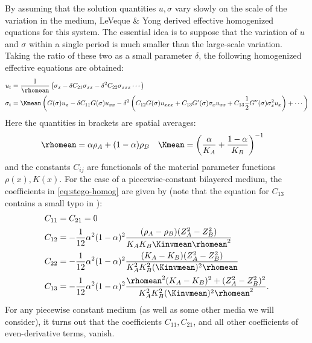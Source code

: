 By assuming that the solution quantities $u, \sigma$ vary slowly
on the scale of the variation in the medium, LeVeque \& Yong derived
effective homogenized equations for this system.    The essential idea is to suppose
that the variation of $u$ and $\sigma$ within a single period is
much smaller than the large-scale variation.  Taking the ratio
of these two as a small parameter $\delta$, the following
homogenized effective equations are obtained:
\begin{align}
u_t & = \frac{1}{\rhomean}\left(\sigma_x-\delta C_{21}\sigma_{xx} 
              - \delta^2 C_{22}\sigma_{xxx} \cdots \right) \\
\sigma_t & = \Kmean\left(G(\sigma)u_x - \delta C_{11}G(\sigma)u_{xx} 
              - \delta^2 \left(C_{12}G(\sigma)u_{xxx} 
                    + C_{13} G'(\sigma)\sigma_x u_{xx} 
                    + C_{13} \frac{1}{2} G''(\sigma)\sigma_x^2 u_x\right)
                    + \cdots \right)
\end{align}
Here the quantities in brackets are spatial averages:
\begin{align}
\rhomean & = \alpha \rho_A + (1-\alpha) \rho_B &
\Kmean   & = \left( \frac{\alpha}{K_A}+\frac{1-\alpha}{K_B} \right)^{-1}
\end{align}
and the constants $C_{ij}$ are functionals of the material parameter
functions $\rho(x), K(x)$.  
For the case of a piecewise-constant bilayered medium,
the coefficients in \eqref{eq:stego-homog} are given by
(note that the equation for $C_{13}$ contains a small typo in
\cite{leveque2003}):
\begin{subequations} \label{eq:stego-coeffs}
\begin{align}
C_{11} & = C_{21}=0 \\
C_{12} & = -\frac{1}{12}\alpha^2(1-\alpha)^2 
            \frac{(\rho_A-\rho_B)(Z_A^2-Z_B^2)}{K_A K_B\Kinvmean \rhomean^2} \\
C_{22} & = -\frac{1}{12}\alpha^2(1-\alpha)^2 
            \frac{(K_A-K_B)(Z_A^2-Z_B^2)}{K_A^2 K_B^2(\Kinvmean)^2 \rhomean} \\
C_{13} & = -\frac{1}{12}\alpha^2(1-\alpha)^2 
            \frac{\rhomean^2(K_A-K_B)^2+(Z_A^2-Z_B^2)^2}
                 {K_A^2 K_B^2 (\Kinvmean)^2 \rhomean^2}.
\end{align}
\end{subequations}
For any piecewise constant medium (as well
as some other media we will consider), it turns out that the coefficients
$C_{11}, C_{21}$, and all other coefficients of even-derivative terms,
vanish.

